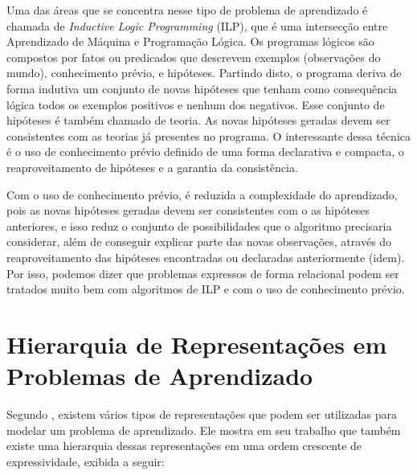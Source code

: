 Uma das áreas que se concentra nesse tipo de problema de aprendizado é chamada de \textit{Inductive Logic Programming} (ILP), que é uma intersecção entre Aprendizado de Máquina e Programação Lógica. Os programas lógicos são compostos por fatos ou predicados que descrevem exemplos (observações do mundo), conhecimento prévio, e hipóteses. Partindo disto, o programa deriva de forma indutiva um conjunto de novas hipóteses que tenham como consequência lógica todos os exemplos positivos e nenhum dos negativos. Esse conjunto de hipóteses é também chamado de teoria. As novas hipóteses geradas devem ser consistentes com as teorias já presentes no programa. O interessante dessa técnica é o uso de conhecimento prévio definido de uma forma declarativa e compacta, o reaproveitamento de hipóteses e a garantia da consistência.

Com o uso de conhecimento prévio, é reduzida a complexidade do aprendizado, pois as novas hipóteses geradas devem ser consistentes com o as hipóteses anteriores, e isso reduz o conjunto de possibilidades que o algoritmo precisaria considerar, além de conseguir explicar parte das novas observações, através do reaproveitamento das hipóteses encontradas ou declaradas anteriormente (idem). Por isso, podemos dizer que problemas expressos de forma relacional podem ser tratados muito bem com algoritmos de ILP e com o uso de conhecimento prévio.

\section{Hierarquia de Representações em Problemas de Aprendizado}
\label{sec:fundamentos}

Segundo \citet{Raedt2008}, existem vários tipos de representações que podem ser utilizadas para modelar um problema de aprendizado. Ele mostra em seu trabalho que também existe uma hierarquia dessas representações em uma ordem crescente de expressividade, exibida a seguir:

